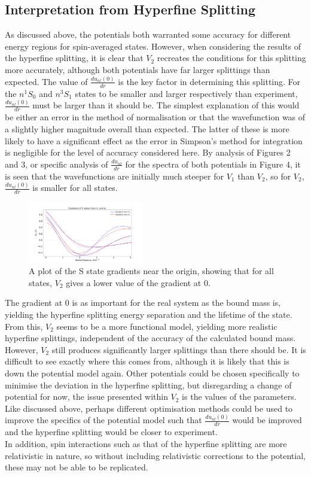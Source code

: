 \documentclass[10pt, twocolumn]{article}
\begin{document}
\subsection{Interpretation from Hyperfine Splitting}
As discussed above, the potentials both warranted some accuracy for different energy regions for spin-averaged states. 
However, when considering the results of the hyperfine splitting, it is clear that $V_2$ recreates the conditions for this splitting more accurately, although both potentials have far larger splittings than expected.
The value of $\frac{du_{nl}(0)}{dr}$ is the key factor in determining this splitting. 
For the $n^1S_0$ and $n^3S_1$ states to be smaller and larger respectively than experiment, $\frac{du_{nl}(0)}{dr}$ must be larger than it should be. 
The simplest explanation of this would be either an error in the method of normalisation or that the wavefunction was of a slightly higher magnitude overall than expected.
The latter of these is more likely to have a significant effect as the error in Simpson's method for integration is negligible for the level of accuracy considered here. 
By analysis of Figures 2 and 3, or specific analysis of $\frac{du_{nl}}{dr}$ for the spectra of both potentials in Figure 4, it is seen that the wavefunctions are initially much steeper for $V_1$ than $V_2$, so for $V_2$, $\frac{du_{nl}(0)}{dr}$ is smaller for all states.
\begin{figure}[H]
    \centering
    \includegraphics[width=0.45\textwidth]{grads}
    \caption{A plot of the S state gradients near the origin, showing that for all states, $V_2$ gives a lower value of the gradient at 0.}
\end{figure}
The gradient at 0 is as important for the real system as the bound mass is, yielding the hyperfine splitting energy separation and the lifetime of the state. 
From this, $V_2$ seems to be a more functional model, yielding more realistic hyperfine splittings, independent of the accuracy of the calculated bound mass. 
However, $V_2$ still produces significantly larger splittings than there should be. 
It is difficult to see exactly where this comes from, although it is likely that this is down the potential model again. 
Other potentials could be chosen specifically to minimise the deviation in the hyperfine splitting, but disregarding a change of potential for now, the issue presented within $V_2$ is the values of the parameters. 
Like discussed above, perhaps different optimisation methods could be used to improve the specifics of the potential model such that $\frac{du_{nl}(0)}{dr}$ would be improved and the hyperfine splitting would be closer to experiment.\\
In addition, spin interactions such as that of the hyperfine splitting are more relativistic in nature, so without including relativistic corrections to the potential, these may not be able to be replicated.
\end{document}
